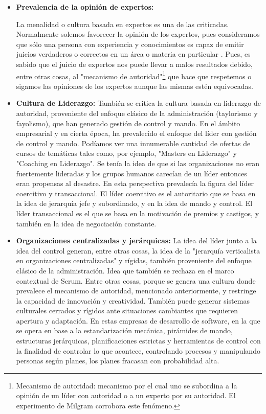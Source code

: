 \begin{itemize}

\item \textbf{Prevalencia de la opinión de expertos: }

La menalidad o cultura basada en expertos es una de las criticadas. Normalmente solemos favorecer la opinión de los expertos, pues consideramos que sólo una persona con experiencia y conocimientos es capaz de emitir juicios verdaderos o correctos en un área o materia en particular \cite{James-Surowiecki-2005}. Pues, es sabido que el juicio de expertos nos puede llevar a malos resultados debido, entre otras cosas, al "mecanismo de autoridad"\footnote{Mecanismo de autoridad: mecanismo por el cual uno se subordina a la opinión de un líder con autoridad o a un experto por su autoridad. El experimento de Milgram corrobora este fenómeno.} que hace que respetemos o sigamos las opiniones de los expertos aunque las mismas estén equivocadas.

\item \textbf{Cultura de Liderazgo: }
También se critica la cultura basada en liderazgo de autoridad, proveniente del enfoque clásico de la administración (taylorismo y fayolismo), que han generado gestión de control y mando. En el ámbito empresarial y en cierta época, ha prevalecido el enfoque del líder con gestión de control y mando. Podíamos ver una innumerable cantidad de ofertas de cursos de temáticas tales como, por ejemplo, "Masters en Liderazgo" y "Coaching en Liderazgo". Se tenía la idea de que si las organizaciones no eran fuertemente lideradas y los grupos humanos carecían de un líder entonces eran propensas al desastre. En esta perspectiva prevalecía la figura del líder coercitivo y transaccional. El líder coercitivo es el autoritario que se basa en la idea de jerarquía jefe y subordinado, y en la idea de mando y control. El líder transaccional es el que se basa en la motivación de premios y castigos, y también en la idea de negociación constante.

\item \textbf{Organizaciones centralizadas y jerárquicas: }
La idea del líder junto a la idea del control generan, entre otras cosas, la idea de la "jerarquía verticalista en organizaciones centralizadas" y rígidas, también proveniente del enfoque clásico de la administración. Idea que también se rechaza en el marco contextual de Scrum. Entre otras cosas, porque se genera una cultura donde prevalece el mecanismo de autoridad, mencionado anteriormente, y restringe la capacidad de innovación y creatividad. También puede generar sistemas culturales cerrados y rígidos ante situaciones cambiantes que requieren apertura y adaptación. En estas empresas de desarrollo de software, en la que se opera en base a la estandarización mecánica, pirámides de mando, estructuras jerárquicas, planificaciones estrictas y herramientas de control con la finalidad de controlar lo que acontece, controlando procesos y manipulando personas según planes, los planes fracasan con probabilidad alta.


\end{itemize}
